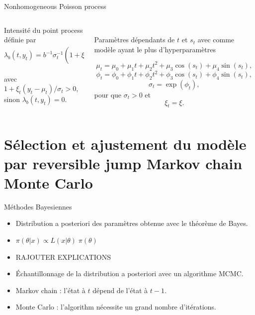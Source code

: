 \documentclass[aspectratio=169]{beamer}
\begin{document}
\begin{frame}{Nonhomogeneous Poisson process}
\begin{columns}
	\begin{column}{0.5\textwidth}
		Intensité du point process définie par
		\vspace{0.1cm} \\
		\begin{equation*}
		\lambda_b(t,y_t) = b^{-1}\sigma_t^{-1} \left( 1+\xi_t\dfrac{y_t-\mu_t}{\sigma_t} \right)^{-1/\xi_t-1}
		\end{equation*}
		\vspace{0.2cm} \\
		avec $1+\xi_t(y_t-\mu_t)/\sigma_t > 0$, \\ sinon $\lambda_b(t,y_t) = 0$.
	\end{column}
	\begin{column}{0.5\textwidth}
	\vspace{0.5cm} \\
		Paramètres dépendants de $t$ et $s_t$ avec comme modèle ayant le plus d'hyperparamètres
		\begin{fleqn}
		\begin{equation*}
		\mu_t = \mu_0 + \mu_1 t + \mu_2 t^2 + \mu_3 \cos(s_t) + \mu_4 \sin(s_t),
		\end{equation*}
		\begin{equation*}
		\phi_t = \phi_0 + \phi_1 t + \phi_2 t^2 + \phi_3 \cos(s_t) + \phi_4 \sin(s_t),
		\end{equation*}
		\begin{equation*}
		\sigma_t = \exp(\phi_t),
		\end{equation*}
		pour que $\sigma_t > 0$ et
		\begin{equation*}
		\xi_t = \xi.
		\end{equation*}
		\end{fleqn}
	\end{column}
\end{columns}
	{\scriptsize
	\cite{northrop_threshold_2016}}
\end{frame}


\section{Sélection et ajustement du modèle par reversible jump Markov chain Monte Carlo}

\begin{frame}{Méthodes Bayesiennes}
	\begin{itemize}
	\setlength{\itemsep}{17pt}
	\item Distribution a posteriori des paramètres obtenue avec le théorème de Bayes.
	\item $\pi(\theta|x) \propto L(x|\theta) \; \pi(\theta)$
	\item RAJOUTER EXPLICATIONS
	\item Échantillonnage de la distribution a posteriori avec un algorithme MCMC.
	\item Markov chain : l'état à $t$ dépend de l'état à $t-1$.
	\item Monte Carlo : l'algorithm nécessite un grand nombre d'itérations.
	\end{itemize}
\end{frame}
\end{document}
